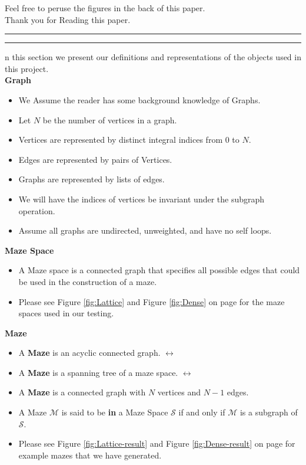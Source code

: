 \documentclass[11pt]{article}
\newcommand{\question}[2] {\vspace{.25in} \hrule\vspace{0.5em}
\noindent{\bf #1: #2} \vspace{0.5em}
\hrule \vspace{.10in}}
\begin{document}
Feel free to peruse the figures in the back of this paper.\\
Thank you for Reading this paper.

\newpage

\question{Background}

In this section we present our definitions and representations of the objects used in this project.\\

\textbf{Graph}
\begin{itemize}
\item We Assume the reader has some background knowledge of Graphs.
\item Let $N$ be the number of vertices in a graph.
\item Vertices are represented by distinct integral indices from 0 to $N$.
\item Edges are represented by pairs of Vertices.
\item Graphs are represented by lists of edges.
\item We will have the indices of vertices be invariant under the subgraph operation.
\item Assume all graphs are undirected, unweighted, and have no self loops.
\end{itemize}


\textbf{Maze Space}
\begin{itemize}
\item A Maze space is a connected graph that specifies all possible edges that could be used in the construction of a maze.
\item Please see Figure \ref{fig:Lattice} and Figure \ref{fig:Dense} on page \pageref{fig:Lattice} for the maze spaces used in our testing.
\end{itemize}

\textbf{Maze}
\begin{itemize}
\item A \textbf{Maze} is an acyclic connected graph. $\leftrightarrow$
\item A \textbf{Maze} is a spanning tree of a maze space. $\leftrightarrow$
\item A \textbf{Maze} is a connected graph with $N$ vertices and $N - 1$ edges.\\
\item A Maze $\mathcal{M}$ is said to be \textbf{in} a Maze Space $\mathcal{S}$ if and only if $\mathcal{M}$ is a subgraph of $\mathcal{S}$.
\item Please see Figure \ref{fig:Lattice-result} and Figure \ref{fig:Dense-result} on page  \pageref{fig:Lattice-result} for example mazes that we have generated.
\end{itemize}
\end{document}
